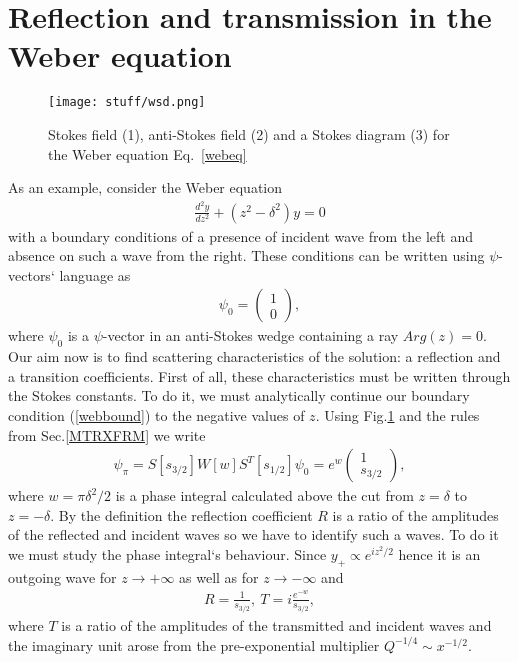 \documentclass[aps,prl,preprint,superscriptaddress]{revtex4}
\begin{document}
\section{Reflection and transmission in the Weber equation \label{WEBER}}

\begin{figure}
\centering
\noindent
\texttt{[image: stuff/wsd.png]}
\caption{Stokes field (1), anti-Stokes field (2) and a Stokes diagram (3) for the Weber equation Eq.~\ref{webeq}}
\label{wsd}
\end{figure} 

As an example, consider the Weber equation
\begin{eqnarray}
\frac{d^2 y}{dz^2}+(z^2-\delta^2)y=0
\label{webeq}
\end{eqnarray}
with a boundary conditions of a presence of incident wave from the left and absence on such a wave from the right. These conditions can be written using $\psi$-vectors` language as
\begin{eqnarray}
\psi_0= \begin{pmatrix} 1 \\ 0 \end{pmatrix},
\label{webbound}
\end{eqnarray}
where $\psi_0$ is a $\psi$-vector in an anti-Stokes wedge containing a ray $Arg(z)=0$. Our aim now is to find scattering characteristics of the solution: a reflection and a transition coefficients. First of all, these characteristics must be written through the Stokes constants. To do it, we must analytically continue our boundary condition (\ref{webbound}) 
to the negative values of $z$. Using Fig.\ref{wsd} and the rules from Sec.\ref{MTRXFRM} we write
\begin{eqnarray}
\psi_{\pi} = S[s_{3/2}]W[w]S^T[s_{1/2}]\psi_0 = e^w\begin{pmatrix} 1 \\ s_{3/2} \end{pmatrix},
\label{wpac}
\end{eqnarray}
where $w=\pi\delta^2/2$ is a phase integral calculated above the cut from $z=\delta$ to $z=-\delta$. By the definition the reflection coefficient $R$ is a ratio of the amplitudes of the reflected and incident waves so we have to identify such a waves. To do it we must study the phase integral`s behaviour. Since $y_+ \propto e^{i z^2/2}$ hence it is an outgoing wave for $z \rightarrow +\infty$ as well as for $z \rightarrow -\infty$ and
\begin{eqnarray}
R = \frac{1}{s_{3/2}},\ T=i\frac{e^{-w}}{s_{3/2}},
\label{rt}
\end{eqnarray}
where $T$ is a ratio of the amplitudes of the transmitted and incident waves and the imaginary unit arose from the pre-exponential multiplier $Q^{-1/4} \sim x^{-1/2}$.
\end{document}
